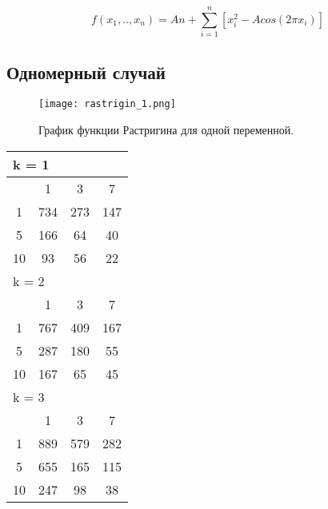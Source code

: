\begin{equation}
\label{rastrigin_eq}
f(x_1, .., x_n) = An + \sum\limits_{i = 1}^n\left[ x_i^2 - Acos\left(2 \pi x_i \right)\right]
\end{equation}

\subsection{Одномерный случай}

\begin{figure}
    \centering
    \texttt{[image: rastrigin\_1.png]}
    \caption{График функции Растригина для одной переменной.}
    \label{rastrigin_plot}
\end{figure}

\begin{table}
 \begin{tabular}{|*4{c|}}
\hline
\multicolumn{4}{|l|}{k = 1} \\
\hline
\multirow{1}{*}{\diagbox{$\mu$}{$\lambda$}} & \multicolumn{1}{c|}{1} & \multicolumn{1}{c|}{3} & \multicolumn{1}{c|}{7} \\
\hline
1 & 734 & 273 & 147 \\
\hline
5 & 166 & 64 & 40 \\
\hline
10 & 93 & 56 & 22 \\
\hline
\multicolumn{4}{|l|}{k = 2} \\
\hline
\multirow{1}{*}{\diagbox{$\mu$}{$\lambda$}} & \multicolumn{1}{c|}{1} & \multicolumn{1}{c|}{3} & \multicolumn{1}{c|}{7} \\
\hline
1 & 767 & 409 & 167 \\
\hline
5 & 287 & 180 & 55 \\
\hline
10 & 167 & 65 & 45 \\
\hline
\multicolumn{4}{|l|}{k = 3} \\
\hline
\multirow{1}{*}{\diagbox{$\mu$}{$\lambda$}} & \multicolumn{1}{c|}{1} & \multicolumn{1}{c|}{3} & \multicolumn{1}{c|}{7} \\
\hline
1 & 889 & 579 & 282 \\
\hline
5 & 655 & 165 & 115 \\
\hline
10 & 247 & 98 & 38 \\
\hline
\end{tabular}
\end{table}

